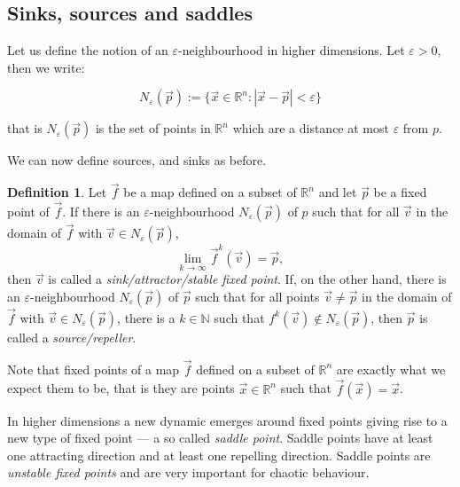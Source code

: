 \documentclass[
  a4paper,
  oneside,
  final]{krantz}
\newcommand{\R}{\mathbb{R}}
\newcommand{\N}{\mathbb{N}}
\renewcommand{\epsilon}{\varepsilon}
\theoremstyle{definition}
\newtheorem{definition}{Definition}[chapter]
\theoremstyle{definition}
\theoremstyle{definition}
\theoremstyle{definition}
\theoremstyle{remark}
\begin{document}
\hypertarget{sinks-sources-and-saddles}{%
\subsection{Sinks, sources and saddles}\label{sinks-sources-and-saddles}}

Let us define the notion of an \(\epsilon\)-neighbourhood in higher dimensions. Let \(\epsilon>0\), then we write:

\[N_{\epsilon}(\vec{p}) := \{ \vec{x} \in \R^{n} : |\vec{x} - \vec{p}| < \epsilon \}\]

that is \(N_{\epsilon}(\vec{p})\) is the set of points in \(\R^{n}\) which are a distance at most \(\epsilon\) from \(p\).

We can now define sources, and sinks as before.

\begin{definition}
\protect\hypertarget{def:sources-sinks-higher-dim}{}\label{def:sources-sinks-higher-dim}Let \(\vec{f}\) be a map defined on a subset of \(\R^n\) and let \(\vec{p}\) be a fixed point of \(\vec{f}\). If there is an \(\epsilon\)-neighbourhood \(N_{\epsilon}(\vec{p})\) of \(p\) such that for all \(\vec{v}\) in the domain of \(\vec{f}\) with \(\vec{v} \in N_{\epsilon}(\vec{p})\), \[\lim_{k \to \infty} \vec{f}^{k}(\vec{v}) = \vec{p},\] then \(\vec{v}\) is called a \emph{sink/attractor/stable fixed point}. If, on the other hand, there is an \(\epsilon\)-neighbourhood \(N_{\epsilon}(\vec{p})\) of \(\vec{p}\) such that for all points \(\vec{v} \ne \vec{p}\) in the domain of \(\vec{f}\) with \(\vec{v} \in N_{\epsilon}(\vec{p})\), there is a \(k \in \N\) such that \(f^{k}(\vec{v}) \notin N_{\epsilon}(\vec{p})\), then \(\vec{p}\) is called a \emph{source/repeller}.
\end{definition}

Note that fixed points of a map \(\vec{f}\) defined on a subset of \(\R^{n}\) are exactly what we expect them to be, that is they are points \(\vec{x}\in \R^{n}\) such that \(\vec{f}(\vec{x}) = \vec{x}\).

In higher dimensions a new dynamic emerges around fixed points giving rise to a new type of fixed point --- a so called \emph{saddle point}. Saddle points have at least one attracting direction and at least one repelling direction. Saddle points are \emph{unstable fixed points} and are very important for chaotic behaviour.
\end{document}

